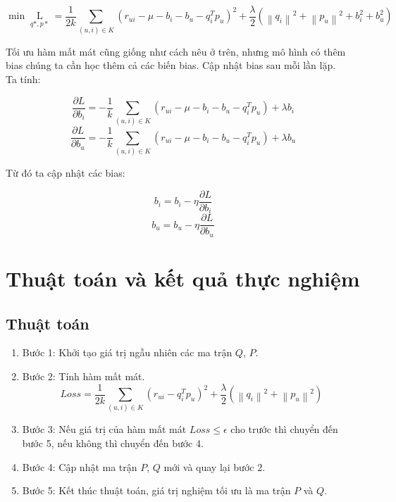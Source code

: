 \begin{center}
    \begin{equation} \label{lossfunc_2}
        \min \mathop {L}\limits_{q*,p*}= \frac{1}{{2k}}\sum\limits_{(u,i) \in K} {{{({r_{ui}} - \mu - b_i - b_u - q_i^T{p_u})}^2} + \frac{\lambda}{2} ({{\left\| {{q_i}} \right\|}^2} + {{\left\| p_u \right\|}^2} + b_i ^2 + b_u ^2)}
    \end{equation}
\end{center}
Tối ưu hàm mất mát cũng giống như cách nêu ở trên, nhưng mô hình có thêm bias chúng ta cần học thêm cả các biến bias. Cập nhật bias sau mỗi lần lặp.\\
Ta tính:
\begin{center}
    \begin{equation}
        \frac{{\partial L}}{{\partial {b_i}}} =  - \frac{1}{k}\sum\limits_{(u,i) \in K} {({r_{ui}} - \mu  - {b_i} - {b_u} - q_i^T{p_u}) + \lambda {b_i}} 
    \end{equation}
    \begin{equation}
        \frac{{\partial L}}{{\partial {b_u}}} =  - \frac{1}{k}\sum\limits_{(u,i) \in K} {({r_{ui}} - \mu  - {b_i} - {b_u} - q_i^T{p_u}) + \lambda {b_u}} 
    \end{equation}
\end{center}
Từ đó ta cập nhật các bias:
\begin{center}
    \begin{equation}
        b_i = b_i - \eta \frac{{\partial L}}{{\partial {b_i}}}
    \end{equation}
    \begin{equation}
        b_u = b_u - \eta \frac{{\partial L}}{{\partial {b_u}}}
    \end{equation}
\end{center}
\section{Thuật toán và kết quả thực nghiệm}
\subsection{Thuật toán}
\begin{enumerate}
    \item Bước 1: Khởi tạo giá trị ngẫu nhiên các ma trận $ Q$, $ P$.
    \item Bước 2: Tính hàm mất mát.
    \begin{equation}
        Loss = \frac{1}{{2k}}\sum\limits_{(u,i) \in K} {{{({r_{ui}} - q_i^T{p_u})}^2} + \frac{\lambda}{2} ({{\left\| {{q_i}} \right\|}^2} + {{\left\| p_u \right\|}^2})} 
    \end{equation}
    \item Bước 3: Nếu giá trị của hàm mất mát $Loss \le  \epsilon$ cho trước thì chuyển đến bước 5, nếu không thì chuyển đến bước 4.
    \item Bước 4: Cập nhật ma trận $P$, $ Q$ mới và quay lại bước 2.
    \item Bước 5: Kết thúc thuật toán, giá trị nghiệm tối ưu là ma trận $P$ và $Q$.
\end{enumerate}
